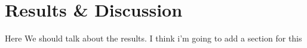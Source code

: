 \chapter{Results \& Discussion}
Here We should talk about the results. I think i'm going to add a section for this
